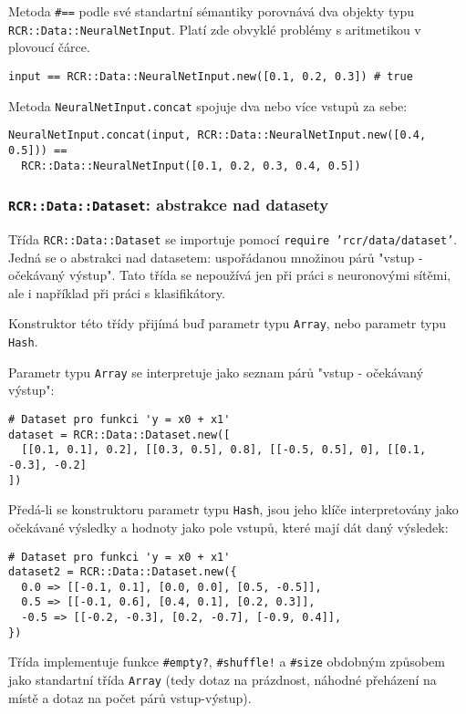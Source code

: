 \documentclass[a4paper]{article}
\begin{document}
Metoda \texttt{\#==} podle své standartní sémantiky porovnává dva objekty typu
\texttt{RCR::Data::NeuralNetInput}. Platí zde obvyklé problémy s aritmetikou
v plovoucí čárce.
\begin{lstlisting}
input == RCR::Data::NeuralNetInput.new([0.1, 0.2, 0.3]) # true
\end{lstlisting}

Metoda \texttt{NeuralNetInput.concat} spojuje dva nebo více vstupů za sebe:
\begin{lstlisting}
NeuralNetInput.concat(input, RCR::Data::NeuralNetInput.new([0.4, 0.5])) ==
  RCR::Data::NeuralNetInput([0.1, 0.2, 0.3, 0.4, 0.5])
\end{lstlisting}


\subsubsection{\texttt{RCR::Data::Dataset}: abstrakce nad datasety}
Třída \texttt{RCR::Data::Dataset} se importuje pomocí \texttt{require
'rcr/data/dataset'}. Jedná se o abstrakci nad datasetem: uspořádanou
množinou párů "vstup - očekávaný výstup". Tato třída se nepoužívá jen
při práci s neuronovými sítěmi, ale i například při práci s klasifikátory.

Konstruktor této třídy přijímá buď parametr typu \texttt{Array}, nebo parametr
typu \texttt{Hash}.

Parametr typu \texttt{Array} se interpretuje jako seznam
párů "vstup - očekávaný výstup":
\begin{lstlisting}
# Dataset pro funkci 'y = x0 + x1'
dataset = RCR::Data::Dataset.new([
  [[0.1, 0.1], 0.2], [[0.3, 0.5], 0.8], [[-0.5, 0.5], 0], [[0.1, -0.3], -0.2]
])
\end{lstlisting}

Předá-li se konstruktoru parametr typu \texttt{Hash}, jsou jeho
klíče interpretovány jako očekávané výsledky a hodnoty jako
pole vstupů, které mají dát daný výsledek:
\begin{lstlisting}
# Dataset pro funkci 'y = x0 + x1'
dataset2 = RCR::Data::Dataset.new({
  0.0 => [[-0.1, 0.1], [0.0, 0.0], [0.5, -0.5]],
  0.5 => [[-0.1, 0.6], [0.4, 0.1], [0.2, 0.3]],
  -0.5 => [[-0.2, -0.3], [0.2, -0.7], [-0.9, 0.4]],
})
\end{lstlisting}

Třída implementuje funkce \texttt{\#empty?}, \texttt{\#shuffle!} a
\texttt{\#size} obdobným způsobem jako standartní třída \texttt{Array}
(tedy dotaz na prázdnost, náhodné přeházení na místě a dotaz na počet párů
vstup-výstup).
\end{document}
